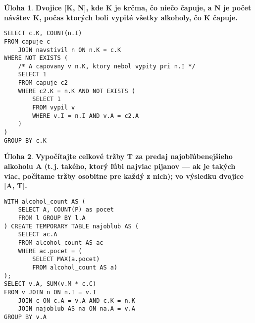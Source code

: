 \documentclass[10pt, a4paper]{article}
\theoremstyle{definition}
\newtheorem{problem}{Úloha}[section]
\begin{document}
\begin{problem}
{\bf Dvojice [K, N], kde K je krčma, čo niečo čapuje, a N je počet návštev K, počas ktorých boli vypité všetky alkoholy, čo K čapuje.}\\[5mm]

\begin{verbatim}
SELECT c.K, COUNT(n.I)
FROM capuje c 
    JOIN navstivil n ON n.K = c.K
WHERE NOT EXISTS (
    /* A capovany v n.K, ktory nebol vypity pri n.I */
    SELECT 1
    FROM capuje c2
    WHERE c2.K = n.K AND NOT EXISTS (
        SELECT 1
        FROM vypil v
        WHERE v.I = n.I AND v.A = c2.A        
    )
)
GROUP BY c.K
\end{verbatim}
\end{problem}

\begin{problem}
{\bf Vypočítajte celkové tržby T za predaj najobľúbenejšieho alkoholu A (t.\,j. takého, ktorý ľúbi najviac pijanov --- ak je takých viac, počítame tržby osobitne pre každý z nich); vo výsledku dvojice [A, T].}\\[5mm]
\begin{minipage}{0.49\textwidth}
\begin{verbatim}
WITH alcohol_count AS (
    SELECT A, COUNT(P) as pocet
    FROM l GROUP BY l.A
) CREATE TEMPORARY TABLE najoblub AS (
    SELECT ac.A
    FROM alcohol_count AS ac
    WHERE ac.pocet = (
        SELECT MAX(a.pocet)
        FROM alcohol_count AS a)
);
SELECT v.A, SUM(v.M * c.C)
FROM v JOIN n ON n.I = v.I
    JOIN c ON c.A = v.A AND c.K = n.K
    JOIN najoblub AS na ON na.A = v.A
GROUP BY v.A
\end{verbatim}
\end{minipage}
\begin{minipage}{0.49\textwidth}
\end{minipage}
\end{problem}
\end{document}
